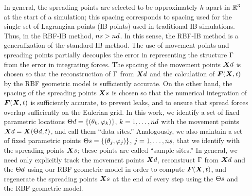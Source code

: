 In general, the spreading points are selected to be approximately $h$ apart in $\mathbb{R}^3$ at the start of a
simulation; this spacing corresponds to spacing used for the single set of Lagrangian points (IB points) used in
traditional IB simulations. Thus, in the RBF-IB method, $\sample\cardinality > \data\cardinality$. In this sense,
the RBF-IB method is a generalization of the standard IB method. The use of movement points and spreading points
partially decouples the error in representing the structure $\Gamma$ from the error in integrating forces. The
spacing of the movement points $\data\X$ is chosen so that the reconstruction of $\Gamma$ from $\data\X$ and
the calculation of $\boldsymbol{F}(\boldsymbol{X}, t)$ by the RBF geometric model is sufficiently accurate. On the other hand, the spacing
of the spreading points $\sample\X$ is chosen so that the numerical integration of $\boldsymbol{F}(\boldsymbol{X}, t)$ is sufficiently
accurate, to prevent leaks, and to ensure that spread forces overlap sufficiently on the Eulerian grid. In this
work, we identify a set of fixed parametric locations $\data\sites = \{(\theta_k, \varphi_k)\}$,
$k=1, \ldots, \data\cardinality$ with the movement points $\data\X = \X(\data\sites, t)$, and call them ``data sites\qend.''
Analogously, we also maintain a set of fixed parametric points $\sample\sites = \{(\theta_j, \varphi_j)\}$,
$j=1, \ldots, \sample\cardinality$, that we identify with the spreading points $\sample\X$; these points are
called ``sample sites\qend.'' In general, we need only explicitly track the movement points $\data\X$, reconstruct
$\Gamma$ from $\data\X$ and the $\data\sites$ using our RBF geometric model in order to compute $\boldsymbol{F}(\boldsymbol{X}, t)$,
and regenerate the spreading points $\sample\X$ at the end of every step using the $\sample\sites$ and the RBF
geometric model.

